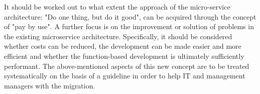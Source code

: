 \documentclass[a4paper,twoside,11pt, pagesize]{scrartcl}
\begin{document}
\begin{spacing}{1.2}
It should be worked out to what extent the approach of the micro-service architecture: "Do one thing, but do it good", can be acquired through the concept of "pay by use". A further focus is on the improvement or solution of problems in the existing microservice architecture. Specifically, it should be considered whether costs can be reduced, the development can be made easier and more efficient and whether the function-based development is ultimately sufficiently performant. 
The above-mentioned aspects of this new concept are to be treated systematically on the basis of a guideline in order to help IT and management managers with the migration.


\end{spacing}
\end{document}
